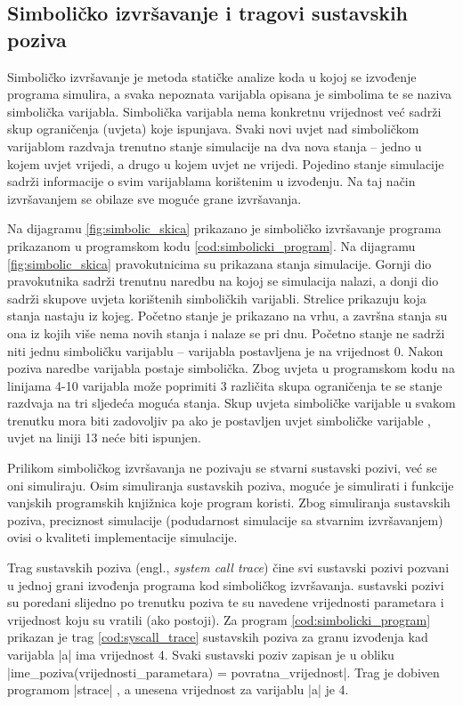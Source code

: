 \pagebreak
\subsection{Simboličko izvršavanje i tragovi sustavskih poziva}
Simboličko izvršavanje je metoda statičke analize koda u kojoj se izvođenje
programa simulira, a svaka nepoznata varijabla opisana je simbolima te se naziva
simbolička varijabla. Simbolička varijabla nema konkretnu vrijednost već sadrži
skup ograničenja (uvjeta) koje ispunjava. Svaki novi uvjet nad simboličkom
varijablom razdvaja trenutno stanje simulacije na dva nova stanja -- jedno u
kojem uvjet vrijedi, a drugo u kojem uvjet ne vrijedi. Pojedino stanje
simulacije  sadrži informacije o svim varijablama korištenim u izvođenju. Na 
taj način izvršavanjem se obilaze sve moguće grane izvršavanja.

 Na dijagramu \ref{fig:simbolic_skica} prikazano
je simboličko izvršavanje programa prikazanom u programskom kodu 
\ref{cod:simbolicki_program}. Na dijagramu \ref{fig:simbolic_skica} 
pravokutnicima su prikazana stanja simulacije. Gornji dio pravokutnika sadrži
trenutnu naredbu na kojoj se simulacija nalazi, a donji dio sadrži skupove
uvjeta korištenih simboličkih varijabli. Strelice prikazuju koja stanja
nastaju iz kojeg. Početno stanje je prikazano na vrhu, a završna stanja su ona
iz kojih više nema novih stanja i nalaze se pri dnu. Početno stanje ne sadrži
niti jednu simboličku varijablu -- varijabla  postavljena je na
vrijednost 0. Nakon poziva naredbe  varijabla  postaje
simbolička. Zbog uvjeta u programskom kodu na linijama 4-10 varijabla
 može poprimiti 3 različita skupa ograničenja te se stanje
razdvaja na tri sljedeća moguća stanja. Skup uvjeta simboličke varijable u 
svakom trenutku mora biti zadovoljiv pa ako je postavljen uvjet simboličke
varijable , uvjet  na liniji 13 neće 
biti ispunjen.

Prilikom simboličkog izvršavanja ne pozivaju se stvarni sustavski pozivi, već
se oni simuliraju. Osim simuliranja sustavskih poziva, moguće je simulirati i
funkcije vanjskih programskih knjižnica koje program koristi. Zbog simuliranja
sustavskih poziva, preciznost simulacije (podudarnost simulacije sa stvarnim
izvršavanjem) ovisi o kvaliteti implementacije simulacije.

Trag sustavskih poziva (engl., \textit{system call trace}) čine svi sustavski 
pozivi pozvani u jednoj grani izvođenja programa kod simboličkog 
izvršavanja. sustavski pozivi su poredani slijedno po trenutku poziva te su
navedene vrijednosti parametara i vrijednost koju su vratili (ako postoji). Za
program \ref{cod:simbolicki_program} prikazan je trag \ref{cod:syscall_trace} 
sustavskih poziva za granu izvođenja kad varijabla \inlinecode|a| ima 
vrijednost 4. Svaki sustavski poziv zapisan je u obliku
\inlinecode|ime_poziva(vrijednosti_parametara) = povratna_vrijednost|. Trag je
dobiven programom \inlinecode|strace| \cite{strace_url}, a unesena vrijednost za varijablu
\inlinecode|a| je 4.




